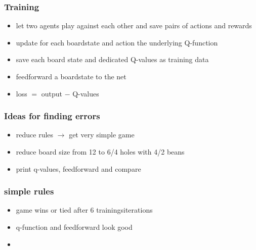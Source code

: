 \documentclass{beamer}
\begin{document}
 
 \begin{frame}
 \frametitle{Training}
 \begin{itemize}
\item let two agents play against each other and save pairs of actions and rewards
\item update for each boardstate and action the underlying Q-function
\item save each board state and dedicated Q-values as training data
\item feedforward a boardstate to the net
\item loss $=$ output $-$ Q-values
\end{itemize}
 \end{frame}
 
\begin{frame}
\frametitle{Ideas for finding errors}
\begin{itemize}
\item reduce rules $\rightarrow$ get very simple game
\item reduce board size from 12 to 6/4 holes with 4/2 beans
\item print q-values, feedforward and compare
\end{itemize}
\end{frame}

\begin{frame}
\frametitle{simple rules}
\begin{itemize}
\item game wins or tied after $6$ trainingsiterations
\item q-function and feedforward look good
\end{itemize}
\end{frame}


\begin{frame}
\begin{itemize}
\frametitle{simple board}
\item
\end{itemize}
\end{frame}
\end{document}
